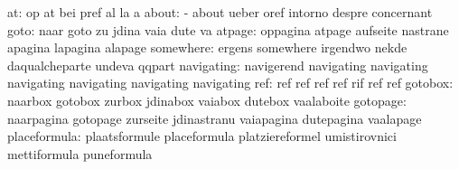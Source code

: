                               at: op                               at
                                  bei                              pref
                                  al                               la
                                  a
                           about: -                                about
                                  ueber                            oref
                                  intorno                          despre
                                  concernant
                            goto: naar                             goto
                                  zu                               jdina
                                  vaia                             dute
                                  va
                          atpage: oppagina                         atpage
                                  aufseite                         nastrane
                                  apagina                          lapagina
                                  alapage
                       somewhere: ergens                           somewhere
                                  irgendwo                         nekde
                                  daqualcheparte                   undeva
                                  qqpart
                      navigating: navigerend                       navigating
                                  navigating                       navigating
                                  navigating                       navigating
                                  navigating
                             ref: ref                              ref
                                  ref                              ref
                                  rif                              ref
                                  ref
                         gotobox: naarbox                          gotobox
                                  zurbox                           jdinabox
                                  vaiabox                          dutebox
                                  vaalaboite
                        gotopage: naarpagina                       gotopage
                                  zurseite                         jdinastranu
                                  vaiapagina                       dutepagina
                                  vaalapage
                    placeformula: plaatsformule                    placeformula
                                  platziereformel                  umistirovnici
                                  mettiformula                     puneformula
